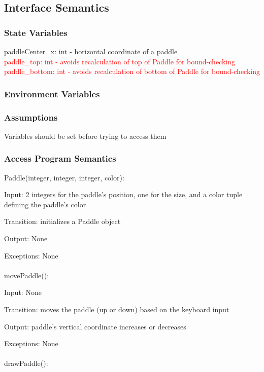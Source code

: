 \documentclass[12pt, titlepage]{article}
\begin{document}
		\subsection{Interface Semantics}
		\subsubsection{State Variables}
		paddleCenter\_x: int - horizontal coordinate of a paddle \\
        \textcolor{red}{paddle\_top: int - avoids recalculation of top of Paddle for bound-checking} \\ 
        \textcolor{red}{paddle\_bottom: int - avoids recalculation of bottom of Paddle for bound-checking} \\
		
		\subsubsection{Environment Variables}
		
		\subsubsection{Assumptions}
		Variables should be set before trying to access them \\ 
		
		\subsubsection{Access Program Semantics}
		Paddle(integer, integer, integer, color):
		
		Input: 2 integers for the paddle's position, one for the size, and a color tuple defining the paddle's color
		
		Transition: initializes a Paddle object
		
		Output: None
		
		Exceptions: None\\
		\\
		movePaddle():
		
		Input: None
		
		Transition: moves the paddle (up or down) based on the keyboard input
		
		Output: paddle's vertical coordinate increases or decreases
		
		Exceptions: None\\
		\\
    	drawPaddle():
		
\end{document}
